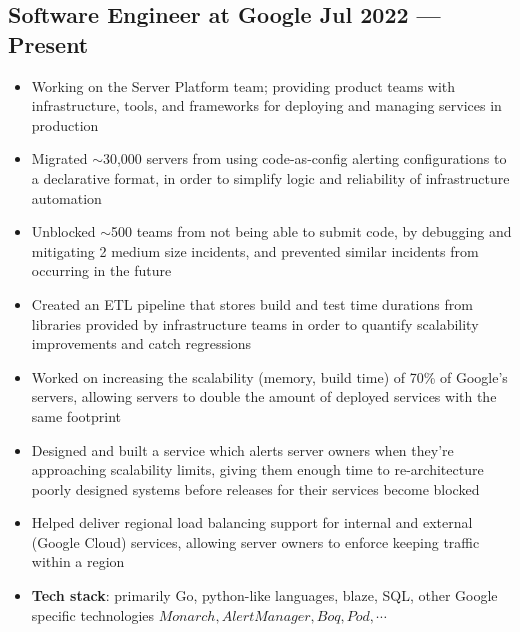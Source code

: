 \documentclass{article}
\begin{document}
\subsection{Software Engineer at Google \hfill Jul 2022 --- Present}
\begin{itemize}
  \itemsep0em
  \item Working on the Server Platform team; providing product teams with infrastructure, tools, and frameworks for deploying and managing services in production
  \item Migrated $\sim$30,000 servers from using code-as-config alerting configurations to a declarative format, in order to simplify logic and reliability of infrastructure automation %
  \item Unblocked $\sim$500 teams from not being able to submit code, by debugging and mitigating 2 medium size incidents, and prevented similar incidents from occurring in the future
  \item Created an ETL pipeline that stores build and test time durations from libraries provided by infrastructure teams in order to quantify scalability improvements and catch regressions
  \item Worked on increasing the scalability (memory, build time) of 70\% of Google's servers, allowing servers to double the amount of deployed services with the same footprint
  \item Designed and built a service which alerts server owners when they're approaching scalability limits, giving them enough time to re-architecture poorly designed systems before releases for their services become blocked
  \item Helped deliver regional load balancing support for internal and external (Google Cloud) services, allowing server owners to enforce keeping traffic within a region
  \item {\bfseries Tech stack}: primarily Go, python-like languages, blaze, SQL, other Google specific technologies \(Monarch, AlertManager, Boq, Pod, \cdots\)
\end{itemize}
\end{document}
